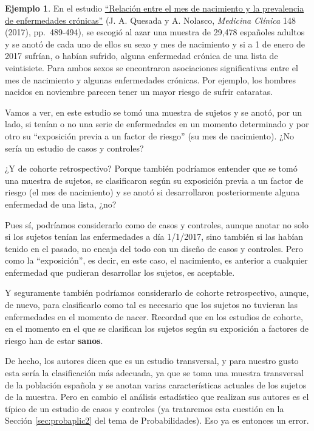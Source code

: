 \documentclass[
]{book}
\theoremstyle{definition}
\theoremstyle{definition}
\newtheorem{example}{Ejemplo}[chapter]
\theoremstyle{definition}
\theoremstyle{definition}
\theoremstyle{remark}
\begin{document}
\begin{example}
\protect\hypertarget{exm:quesada}{}\label{exm:quesada}En el estudio \href{https://www.sciencedirect.com/science/article/pii/S0025775316305693}{``Relación entre el mes de nacimiento y la prevalencia de enfermedades crónicas''} (J. A. Quesada y A. Nolasco, \emph{Medicina Clínica} 148 (2017), pp.~489-494), se escogió al azar una muestra de 29,478 españoles adultos y se anotó de cada uno de ellos su sexo y mes de nacimiento y si a 1 de enero de 2017 sufrían, o habían sufrido, alguna enfermedad crónica de una lista de veintisiete. Para ambos sexos se encontraron asociaciones significativas entre el mes de nacimiento y algunas enfermedades crónicas. Por ejemplo, los hombres nacidos en noviembre parecen tener un mayor riesgo de sufrir cataratas.
\end{example}

\begin{rmdromans}
Vamos a ver, en este estudio se tomó una muestra de sujetos y se anotó, por un lado, si tenían o no una serie de enfermedades en un momento determinado y por otro su ``exposición previa a un factor de riesgo'' (su mes de nacimiento). ¿No sería un estudio de casos y controles?

¿Y de cohorte retrospectivo? Porque también podríamos entender que se tomó una muestra de sujetos, se clasificaron según su exposición previa a un factor de riesgo (el mes de nacimiento) y se anotó si desarrollaron posteriormente alguna enfermedad de una lista, ¿no?
\end{rmdromans}

Pues sí, podríamos considerarlo como de casos y controles, aunque anotar no solo si los sujetos tenían las enfermedades a día 1/1/2017, sino también si las habían tenido en el pasado, no encaja del todo con un diseño de casos y controles. Pero como la ``exposición'', es decir, en este caso, el nacimiento, es anterior a cualquier enfermedad que pudieran desarrollar los sujetos, es aceptable.

Y seguramente también podríamos considerarlo de cohorte retrospectivo, aunque, de nuevo, para clasificarlo como tal es necesario que los sujetos no tuvieran las enfermedades en el momento de nacer. Recordad que en los estudios de cohorte, en el momento en el que se clasifican los sujetos según su exposición a factores de riesgo han de estar \textbf{sanos}.

De hecho, los autores dicen que es un estudio transversal, y para nuestro gusto esta sería la clasificación más adecuada, ya que se toma una muestra transversal de la población española y se anotan varias características actuales de los sujetos de la muestra. Pero en cambio el análisis estadístico que realizan sus autores es el típico de un estudio de casos y controles (ya trataremos esta cuestión en la Sección \ref{sec:probaplic2} del tema de Probabilidades). Eso ya es entonces un error.
\end{document}
